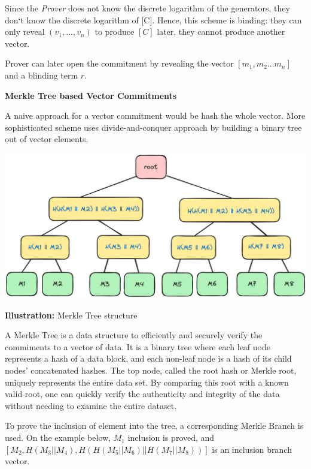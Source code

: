 \documentclass[../lecture-notes.tex]{subfiles}
\begin{document}
Since the \textit{Prover} does not know the discrete logarithm of the generators, they don`t know the discrete logarithm of [C]. Hence, this scheme is binding: they can only reveal $(v_1,...,v_n)$ to produce $[C]$ later, they cannot produce another vector.

Prover can later open the commitment by revealing the vector $[m_1, m_2 ... m_n]$ and a blinding term $r$.

\vspace{0.5 cm}

\textbf{Merkle Tree based Vector Commitments}

A naive approach for a vector commitment would be hash the whole vector. More sophisticated scheme uses divide-and-conquer approach by building a binary tree out of vector elements.

\begin{center}
    \centering\includegraphics[width=0.9\linewidth, clip]{images/lecture_5/MerkleTree.png}

    \scriptsize{\textbf{Illustration:} Merkle Tree structure}
\end{center}

A Merkle Tree is a data structure to efficiently and securely verify the commiments to a vector of data. It is a binary tree where each leaf node represents a hash of a data block, and each non-leaf node is a hash of its child nodes' concatenated hashes. The top node, called the root hash or Merkle root, uniquely represents the entire data set. By comparing this root with a known valid root, one can quickly verify the authenticity and integrity of the data without needing to examine the entire dataset. 

To prove the inclusion of element into the tree, a corresponding Merkle Branch is used. On the example below, $M_1$ inclusion is proved, and 
$[M_2, H(M_3 || M_4), H(H(M_5 || M_6) || H(M_7 || M_8))]$ is an inclusion branch vector.
\end{document}
